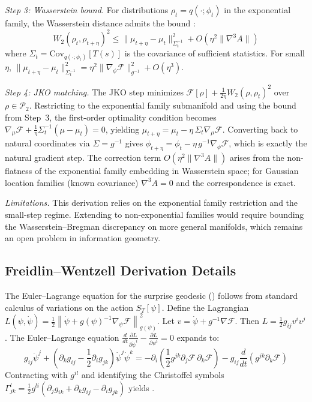 \documentclass[11pt,a4paper]{article}
\theoremstyle{definition}
\newcommand{\VFE}{\mathcal{F}}
\newcommand{\cP}{\mathcal{P}}
\newcommand{\Wass}{W_2}
\begin{document}
\textit{Step 3: Wasserstein bound.} For distributions $\rho_t = q(\cdot; \phi_t)$ in the exponential family, the Wasserstein distance admits the bound \citep{takatsu2011wasserstein}:
\begin{equation}
  \Wass(\rho_t, \rho_{t+\eta})^2 \leq \|\mu_{t+\eta} - \mu_t\|^2_{\Sigma_t^{-1}} + O(\eta^2 \|\nabla^3 A\|)
\end{equation}
where $\Sigma_t = \mathrm{Cov}_{q(\cdot;\phi_t)}[T(s)]$ is the covariance of sufficient statistics. For small $\eta$, $\|\mu_{t+\eta} - \mu_t\|_{\Sigma_t^{-1}}^2 = \eta^2 \|\nabla_\phi \VFE\|_{g^{-1}}^2 + O(\eta^3)$.

\textit{Step 4: JKO matching.} The JKO step minimizes $\VFE[\rho] + \frac{1}{2\eta} \Wass(\rho, \rho_t)^2$ over $\rho \in \cP_2$. Restricting to the exponential family submanifold and using the bound from Step~3, the first-order optimality condition becomes $\nabla_\mu \VFE + \frac{1}{\eta} \Sigma_t^{-1}(\mu - \mu_t) = 0$, yielding $\mu_{t+\eta} = \mu_t - \eta \, \Sigma_t \nabla_\mu \VFE$. Converting back to natural coordinates via $\Sigma = g^{-1}$ gives $\phi_{t+\eta} = \phi_t - \eta \, g^{-1} \nabla_\phi \VFE$, which is exactly the natural gradient step. The correction term $O(\eta^2 \|\nabla^3 A\|)$ arises from the non-flatness of the exponential family embedding in Wasserstein space; for Gaussian location families (known covariance) $\nabla^3 A = 0$ and the correspondence is exact.

\textit{Limitations.} This derivation relies on the exponential family restriction and the small-step regime. Extending to non-exponential families would require bounding the Wasserstein--Bregman discrepancy on more general manifolds, which remains an open problem in information geometry.

\subsection{Freidlin--Wentzell Derivation Details}
\label{app:fw_details}

The Euler--Lagrange equation for the surprise geodesic () follows from standard calculus of variations on the action $S_T[\psi]$. Define the Lagrangian $L(\psi, \dot{\psi}) = \frac{1}{2} \left\|\dot{\psi} + g(\psi)^{-1} \nabla_\psi \VFE\right\|^2_{g(\psi)}$. Let $v = \dot{\psi} + g^{-1} \nabla \VFE$. Then $L = \frac{1}{2} g_{ij} v^i v^j$. The Euler--Lagrange equation $\frac{d}{dt} \frac{\partial L}{\partial \dot{\psi}^i} - \frac{\partial L}{\partial \psi^i} = 0$ expands to:
\begin{equation}
  g_{ij} \ddot{\psi}^j + \left(\partial_k g_{ij} - \frac{1}{2} \partial_i g_{jk}\right) \dot{\psi}^j \dot{\psi}^k = -\partial_i\left(\frac{1}{2} g^{jk} \partial_j \VFE \, \partial_k \VFE\right) - g_{ij} \frac{d}{dt}\left(g^{jk} \partial_k \VFE\right)
\end{equation}
Contracting with $g^{il}$ and identifying the Christoffel symbols $\Gamma^l_{jk} = \frac{1}{2} g^{li}(\partial_j g_{ik} + \partial_k g_{ij} - \partial_i g_{jk})$ yields .
\end{document}
